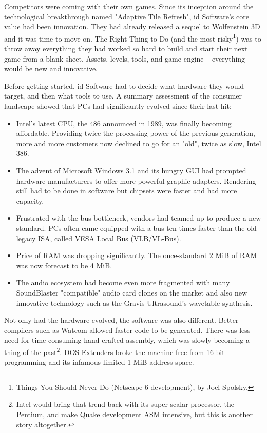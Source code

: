 Competitors were coming with their own games. Since its inception around the technological breakthrough named "Adaptive Tile Refresh", id Software's core value had been innovation. They had already released a sequel to Wolfenstein 3D and it was time to move on. The Right Thing to Do (and the most risky\footnote{Things You Should Never Do (Netscape 6 development), by Joel Spolsky.}) was to throw away everything they had worked so hard to build and start their next game from a blank sheet. Assets, levels, tools, and game engine -- everything would be new and innovative.\\
\par
Before getting started, id Software had to decide what hardware they would target, and then what tools to use. A summary assessment of the consumer landscape showed that PCs had significantly evolved since their last hit:
\begin{itemize}
\item Intel's latest CPU, the 486 announced in 1989, was finally becoming affordable. Providing twice the processing power of the previous generation, more and more customers now declined to go for an "old", twice as slow, Intel 386. 
\item The advent of Microsoft Windows 3.1 and its hungry GUI had prompted hardware manufacturers to offer more powerful graphic adapters. Rendering still had to be done in software but chipsets were faster and had more capacity.
\item Frustrated with the bus bottleneck, vendors had teamed up to produce a new standard. PCs often came equipped with a bus ten times faster than the old legacy ISA, called VESA Local Bus (VLB/VL-Bus). 
\item Price of RAM was dropping significantly. The once-standard 2 MiB of RAM was now forecast to be 4 MiB. 
\item The audio ecosystem had become even more fragmented with many SoundBlaster "compatible" audio card clones on the market and also new innovative technology such as the Gravis Ultrasound's wavetable synthesis.\\
\end{itemize}
 \par 
 Not only had the hardware evolved, the software was also different. Better compilers such as Watcom allowed faster code to be generated. There was less need for time-consuming hand-crafted assembly, which was slowly becoming a thing of the past\footnote{Intel would bring that trend back with its super-scalar processor, the Pentium, and make Quake development ASM intensive, but this is another story altogether.}. DOS Extenders broke the machine free from 16-bit programming and its infamous limited 1 MiB address space.\\
